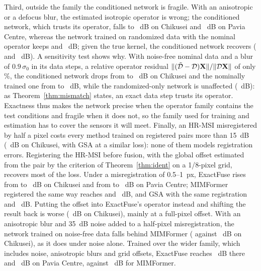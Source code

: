 \documentclass[journal]{IEEEtran}
\begin{document}
Third, outside the family the conditioned network is fragile. With an anisotropic or a defocus blur, the estimated isotropic operator is wrong; the conditioned network, which trusts its operator, falls to ~dB on Chikusei and ~dB on Pavia Centre, whereas the network trained on randomized data with the nominal operator keeps  and ~dB; given the true kernel, the conditioned network recovers ( and ~dB). A sensitivity test shows why. With noise-free nominal data and a blur of $0.9\,\sigma_0$ in its data steps, a relative operator residual $\|(\tilde{\mathcal{D}}-\mathcal{D})\mathbf{X}\|/\|\mathcal{D}\mathbf{X}\|$ of only \%, the conditioned network drops from  to ~dB on Chikusei and the nominally trained one from  to ~dB, while the randomized-only network is unaffected (~dB): as Theorem~\ref{thm:mismatch} states, an exact data step trusts its operator. Exactness thus makes the network precise when the operator family contains the test conditions and fragile when it does not, so the family used for training and estimation has to cover the sensors it will meet. Finally, an HR-MSI misregistered by half a pixel costs every method trained on registered pairs more than 15~dB (~dB on Chikusei, with GSA at a similar loss): none of them models registration errors. Registering the HR-MSI before fusion, with the global offset estimated from the pair by the criterion of Theorem~\ref{thm:ident} on a 1/8-pixel grid, recovers most of the loss. Under a misregistration of 0.5--1~px, ExactFuse rises from  to ~dB on Chikusei and from  to ~dB on Pavia Centre; MIMFormer registered the same way reaches  and ~dB, and GSA with the same registration  and ~dB. Putting the offset into ExactFuse's operator instead and shifting the result back is worse (~dB on Chikusei), mainly at a full-pixel offset. With an anisotropic blur and 35~dB noise added to a half-pixel misregistration, the network trained on noise-free data falls behind MIMFormer ( against ~dB on Chikusei), as it does under noise alone. Trained over the wider family, which includes noise, anisotropic blurs and grid offsets, ExactFuse reaches ~dB there and ~dB on Pavia Centre, against ~dB for MIMFormer.
\end{document}

